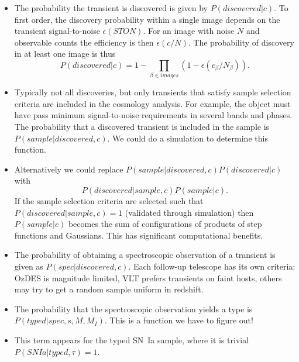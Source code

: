\documentclass[preprint,3p]{elsarticle}
\begin{document}
\begin{itemize}
\item The probability the transient is discovered is given by
$P(discovered |c)$.  To first order, the discovery probability within a single image depends on the transient signal-to-noise $\epsilon(STON)$.  For
an image with noise $N$ and observable counts the efficiency is then $\epsilon(c/N)$.  The probability of discovery in at least one image is
thus
\begin{equation}
P(discovered |c)= 1-\prod_{\beta \in images} \left(1-\epsilon(c_\beta/N_\beta)\right).
 \end{equation}
\item Typically not all discoveries, but only transients that satisfy sample selection criteria are included in the cosmology
analysis.  For example, the object must have pass minimum signal-to-noise requirements in several bands and phases.
The probability that a discovered transient is included in the sample is $P(sample| discovered, c)$.
We could do a simulation to determine this function.
\item Alternatively we could replace  $P(sample| discovered, c)P(discovered |c)$ with
\begin{equation}
P(discovered | sample, c)P(sample |c).
\end{equation}
If the sample selection criteria are selected such that $P(discovered | sample, c)=1$ (validated through simulation) then
$P(sample |c)$ becomes the sum of  configurations of products of step functions and Gaussians.  This has significant
computational benefits.
\item The probability of obtaining a spectroscopic observation of a transient is given as $P(spec | discovered, c)$.  Each follow-up telescope
has its own criteria: OzDES is magnitude limited, VLT prefers transients on faint hosts, others may try to get a random sample uniform in
redshift.
\item The probability that the spectroscopic observation yields a type is $P(typed | spec, s, M, M_I)$.  This is a function we have to
figure out!
\item This term appears for the typed SN~Ia sample, where it is trivial $P(SNIa|  typed, \tau)=1$.
\end{itemize}
\end{document}
